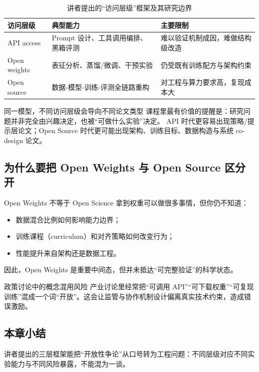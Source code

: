 \documentclass[a4paper]{article}
\begin{document}
\begin{table}[H]
\centering
\begin{tabular}{p{2.4cm}p{4.2cm}p{4.8cm}}
\toprule
\textbf{访问层级} & \textbf{典型能力} & \textbf{主要限制} \\
\midrule
API access & Prompt 设计、工具调用编排、黑箱评测 & 难以验证机制成因，难做结构级改造 \\
Open weights & 表征分析、蒸馏/微调、干预实验 & 仍受既有训练配方与架构约束 \\
Open source & 数据-模型-训练-评测全链路重构 & 对工程与算力要求高，复现成本大 \\
\bottomrule
\end{tabular}
\caption{讲者提出的“访问层级”框架及其研究边界}
\end{table}

\begin{importantbox}{同一模型，不同访问层级会导向不同论文类型}
课程里最有价值的提醒是：研究问题并非完全由兴趣决定，也被“可做什么实验”决定。  
API 时代更容易出现策略/提示层论文；Open Source 时代更可能出现架构、训练目标、数据构造与系统 co-design 论文。
\end{importantbox}

\subsection{为什么要把 Open Weights 与 Open Source 区分开}
\begin{knowledgebox}{Open Weights 不等于 Open Science}
拿到权重可以做很多事情，但你仍不知道：
\begin{itemize}
    \item 数据混合比例如何影响能力边界；
    \item 训练课程（curriculum）和对齐策略如何改变行为；
    \item 性能提升来自架构还是数据工程。
\end{itemize}
因此，Open Weights 是重要中间态，但并未抵达“可完整验证”的科学状态。
\end{knowledgebox}

\begin{warningbox}{政策讨论中的概念混用风险}
产业讨论里经常把“可调用 API”“可下载权重”“可复现训练”混成一个词“开放”。这会让监管与协作机制设计偏离真实技术约束，造成错误激励。
\end{warningbox}

\subsection{本章小结}
讲者提出的三层框架能把“开放性争论”从口号转为工程问题：不同层级对应不同实验能力与不同风险暴露，不能混为一谈。
\end{document}

